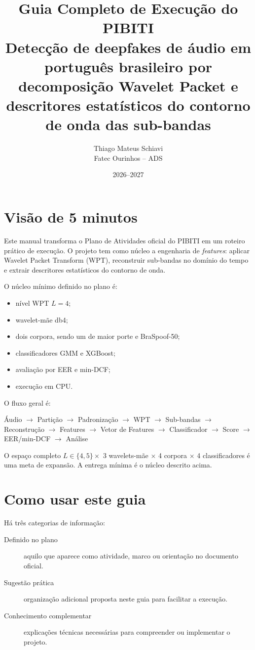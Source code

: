 \documentclass[12pt,a4paper]{article}
\title{\textbf{Guia Completo de Execução do PIBITI}\\
\large Detecção de deepfakes de áudio em português brasileiro por decomposição Wavelet Packet e descritores estatísticos do contorno de onda das sub-bandas}
\author{Thiago Mateus Schiavi\\Fatec Ourinhos -- ADS}
\date{2026--2027}
\begin{document}
\maketitle
\tableofcontents
\newpage

\section{Visão de 5 minutos}

Este manual transforma o Plano de Atividades oficial do PIBITI em um roteiro prático de execução. O projeto tem como núcleo a engenharia de \textit{features}: aplicar Wavelet Packet Transform (WPT), reconstruir sub-bandas no domínio do tempo e extrair descritores estatísticos do contorno de onda.

O núcleo mínimo definido no plano é:
\begin{itemize}
    \item nível WPT $L=4$;
    \item wavelet-mãe db4;
    \item dois corpora, sendo um de maior porte e BraSpoof-50;
    \item classificadores GMM e XGBoost;
    \item avaliação por EER e min-DCF;
    \item execução em CPU.
\end{itemize}

O fluxo geral é:

\begin{center}
Áudio $\rightarrow$ Partição $\rightarrow$ Padronização $\rightarrow$ WPT
$\rightarrow$ Sub-bandas $\rightarrow$ Reconstrução $\rightarrow$ Features
$\rightarrow$ Vetor de Features $\rightarrow$ Classificador
$\rightarrow$ Score $\rightarrow$ EER/min-DCF $\rightarrow$ Análise
\end{center}

O espaço completo $L\in\{4,5\}\times$ 3 wavelets-mãe $\times$ 4 corpora $\times$ 4 classificadores é uma meta de expansão. A entrega mínima é o núcleo descrito acima.

\section{Como usar este guia}

Há três categorias de informação:
\begin{description}
    \item[Definido no plano] aquilo que aparece como atividade, marco ou orientação no documento oficial.
    \item[Sugestão prática] organização adicional proposta neste guia para facilitar a execução.
    \item[Conhecimento complementar] explicações técnicas necessárias para compreender ou implementar o projeto.
\end{description}
\end{document}
